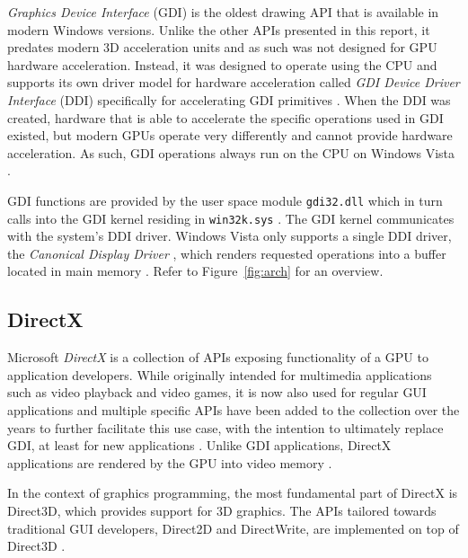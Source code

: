		 \label{sec:gdi}
			\textit{Graphics Device Interface} (GDI) is the oldest drawing API
			that is available in modern Windows versions. Unlike the other
			APIs presented in this report,
			it predates modern 3D acceleration units and as such
			was not designed for GPU hardware acceleration. Instead, it was
			designed to operate using the CPU and supports its own driver model
			for hardware acceleration called \textit{GDI Device Driver
			Interface} (DDI) specifically for accelerating GDI
			primitives \cite{d2dvsgdi}. When the DDI was created, hardware that is able to
			accelerate the specific operations used in GDI existed, but modern GPUs operate
			very differently and cannot provide hardware acceleration. As such,
			GDI operations always run on the CPU on Windows Vista \cite{d2dvsgdi}.

			GDI functions are provided by the user space module
			\texttt{gdi32.dll} which in turn calls into the GDI kernel residing
			in \texttt{win32k.sys} \cite{d2dvsgdi}. The GDI kernel communicates with the
			system's DDI driver. Windows Vista only supports a single DDI driver,
			the \textit{Canonical Display Driver} \cite{d2dvsgdi}, which renders requested operations
			into a buffer located in main memory \cite{dwmredirect}. Refer to Figure~\ref{fig:arch}
			for an overview.

		\subsection{DirectX}
			Microsoft \textit{DirectX} is a collection of APIs exposing functionality of
			a GPU to application developers. While originally intended for
			multimedia applications such as video playback and video games, it
			is now also used for regular GUI applications and multiple specific
			APIs have been added to the collection over the years to further
			facilitate this use case, with the intention to ultimately replace GDI, at
			least for new applications \cite{aboutd2d}.
			Unlike GDI applications, DirectX applications
			are rendered by the GPU into video memory \cite{d2dvsgdi}.

			In the context of graphics programming, the most fundamental part of
			DirectX is Direct3D, which provides support for 3D graphics. The
			APIs tailored towards traditional GUI developers, Direct2D and
			DirectWrite, are implemented on top of Direct3D \cite{aboutd2d}.

